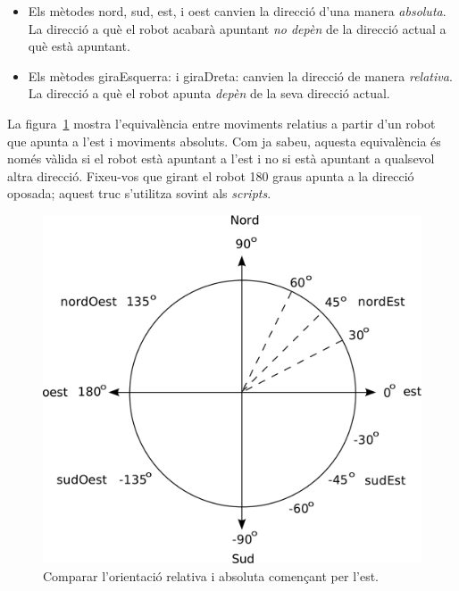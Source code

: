 \begin{itemize}
\item Els mètodes \textsf{nord}, \textsf{sud}, \textsf{est}, i \textsf{oest} canvien la direcció d'una manera \emph{absoluta}. La direcció a què el robot acabarà apuntant  \emph{no depèn} de la direcció actual a què està apuntant.
\item Els mètodes \textsf{giraEsquerra:} i \textsf{giraDreta:} canvien la direcció de manera \emph{relativa}. La direcció a què el robot apunta \emph{depèn} de la seva direcció actual.
\end{itemize}

La figura~\ref{fig0403} mostra l'equivalència entre moviments relatius a partir d'un robot que apunta a l'est i moviments absoluts.
Com ja sabeu, aquesta equivalència és només vàlida si el robot està apuntant a l'est i no si està apuntant a qualsevol altra direcció.
Fixeu-vos que girant el robot 180 graus apunta a la direcció oposada; aquest truc s'utilitza sovint als \emph{scripts}.

\begin{figure}[h!]
\begin{center}
\includegraphics[scale=0.25]{Imatges/figura4-3}
\end{center}
\caption{Comparar l'orientació relativa i absoluta començant per l'est.}
\label{fig0403}
\end{figure}


